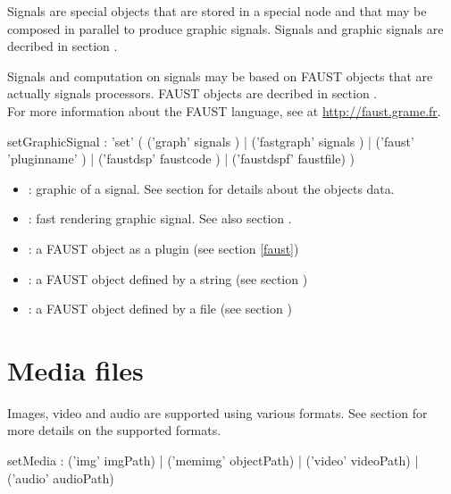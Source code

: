 \documentclass[a4paper,twoside]{report}
\newcommand{\sublevel}[1]	{\section{#1}}
\begin{document}
Signals are special objects that are stored in a special  node and that may be composed in parallel to produce graphic signals. Signals and graphic signals are decribed in section .

Signals and computation on signals may be based on FAUST objects that are actually signals processors. FAUST objects are decribed in section . \\
For more information about the FAUST language, see at \url{http://faust.grame.fr}.


\begin{rail}
setGraphicSignal : 'set' (
	('graph' signals ) |
	('fastgraph' signals ) |
	('faust' 'pluginname' ) |
	('faustdsp' faustcode ) |
	('faustdspf' faustfile)
)
\end{rail}

\begin{itemize}
\item {}: graphic of a signal. See section  for details about the  objects data.
\item {}: fast rendering graphic signal. See also section .
\item {}: a FAUST object as a plugin (see section \ref{faust})
\item {}: a FAUST object defined by a string (see section )
\item {}: a FAUST object defined by a file (see section )
\end{itemize}


\sublevel{Media files}
\label{imgscore}

Images, video and audio are supported using various formats. See section  for more details on the supported formats.


\begin{rail}
setMedia : 
	('img' imgPath) |
	('memimg' objectPath) |
	('video' videoPath) |
	('audio' audioPath)
\end{rail}
\end{document}
